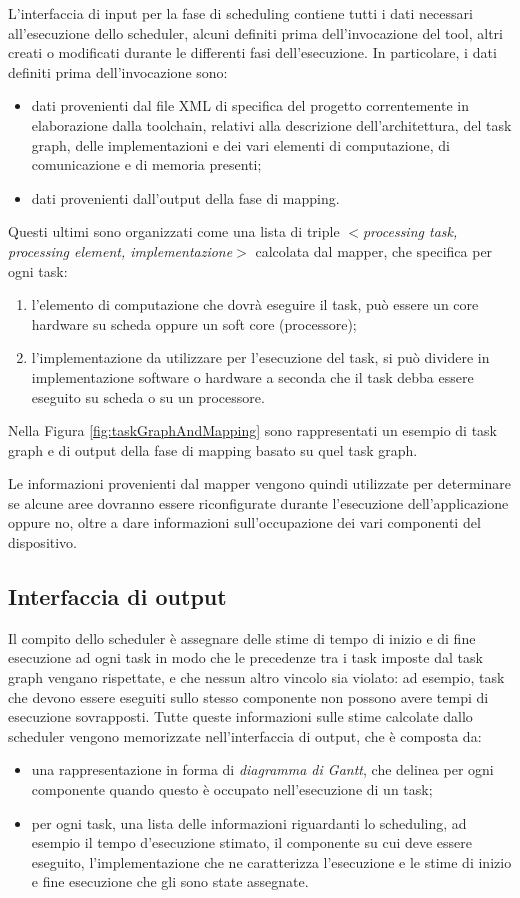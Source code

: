 L'interfaccia di input per la fase di scheduling contiene tutti i dati 
necessari all'esecuzione dello scheduler, alcuni definiti prima 
dell'invocazione del tool, altri creati o modificati durante le differenti fasi 
dell'esecuzione. In particolare, i dati definiti prima dell'invocazione sono:
\begin{itemize}
 \item dati provenienti dal file XML di specifica del progetto correntemente in 
elaborazione dalla toolchain, relativi alla descrizione dell'architettura, del 
task graph, delle implementazioni e dei vari elementi 
di computazione, di 
comunicazione e di memoria presenti;
 \item dati provenienti dall'output della fase di mapping.
\end{itemize}
Questi ultimi sono organizzati come una lista di triple \emph{$<$processing 
task, processing element, implementazione$>$} calcolata dal mapper, che 
specifica per ogni task:
\begin{enumerate}
 \item l'elemento di computazione che dovrà eseguire il task, può essere un 
core hardware su scheda oppure un soft core (processore);
 \item l'implementazione da utilizzare per l'esecuzione del task, si può 
dividere in implementazione software o hardware a seconda che il task debba 
essere eseguito su scheda o su un processore.
\end{enumerate}
Nella Figura \ref{fig:taskGraphAndMapping} sono rappresentati un esempio di 
task graph e di output della fase di mapping basato su quel task graph.

Le informazioni provenienti dal mapper vengono quindi utilizzate per 
determinare se alcune aree dovranno essere riconfigurate durante l'esecuzione 
dell'applicazione oppure no, oltre a dare informazioni sull'occupazione dei 
vari componenti del dispositivo.


\subsection{Interfaccia di output}

Il compito dello scheduler è assegnare delle stime di tempo di inizio e di fine 
esecuzione ad ogni task in modo che le precedenze tra i task imposte dal task 
graph vengano rispettate, e che nessun altro vincolo sia violato: ad esempio, 
task che devono essere eseguiti sullo stesso componente non possono avere tempi 
di esecuzione sovrapposti. Tutte queste informazioni sulle stime calcolate 
dallo scheduler vengono memorizzate nell'interfaccia di output, che è composta 
da:
\begin{itemize}
 \item una rappresentazione in forma di \emph{diagramma di Gantt}, che delinea 
per ogni componente quando questo è occupato nell'esecuzione di un task;
 \item per ogni task, una lista delle informazioni riguardanti lo scheduling, 
ad esempio il tempo d'esecuzione stimato, il componente su cui deve essere 
eseguito, l'implementazione che ne caratterizza l'esecuzione e le stime di 
inizio e fine esecuzione che gli sono state assegnate.
\end{itemize}

